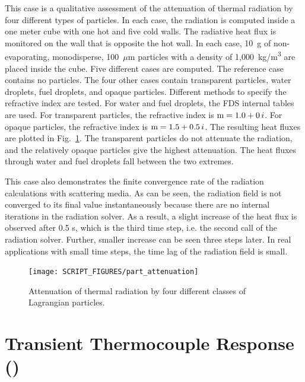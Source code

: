 \documentclass[11pt]{book}
\begin{document}
This case is a qualitative assessment of the attenuation of thermal radiation by four different types of particles. In each case, the radiation is computed inside a one meter cube with one hot and five cold walls. The radiative heat flux is monitored on the wall that is opposite the hot wall. In each case, 10~g of non-evaporating, monodisperse, 100~$\mu$m particles with a density of 1,000~\si{kg/m^3} are placed inside the cube. Five different cases are computed. The reference case contains no particles. The four other cases contain transparent particles, water droplets, fuel droplets, and opaque particles. Different methods to specify the refractive index are tested. For water and fuel droplets, the FDS internal tables are used. For transparent particles, the refractive index is $\hbox{m} = 1.0+0\,i$. For opaque particles, the refractive index is $\hbox{m} = 1.5+0.5 \,i$. The resulting heat fluxes are plotted in Fig.~\ref{part_attenuation_figure}. The transparent particles do not attenuate the radiation, and the relatively opaque particles give the highest attenuation. The heat fluxes through water and fuel droplets fall between the two extremes.

This case also demonstrates the finite convergence rate of the radiation calculations with scattering media. As can be seen, the radiation field is not converged to its final value instantaneously because there are no internal iterations in the radiation solver. As a result, a slight increase of the heat flux is observed after 0.5 s, which is the third time step, i.e. the second call of the radiation solver. Further, smaller increase can be seen three steps later. In real applications with small time steps, the time lag of the radiation field is small.

\begin{figure}[h]
\centering
\texttt{[image: SCRIPT\_FIGURES/part\_attenuation]}
\caption[Radiation attenuation by Lagrangian particles]{Attenuation of thermal radiation by four different classes of Lagrangian particles.}
\label{part_attenuation_figure}
\end{figure}



\section{Transient Thermocouple Response (\texorpdfstring{}{TC\_heating}) }
\label{TC_heating}
\end{document}

